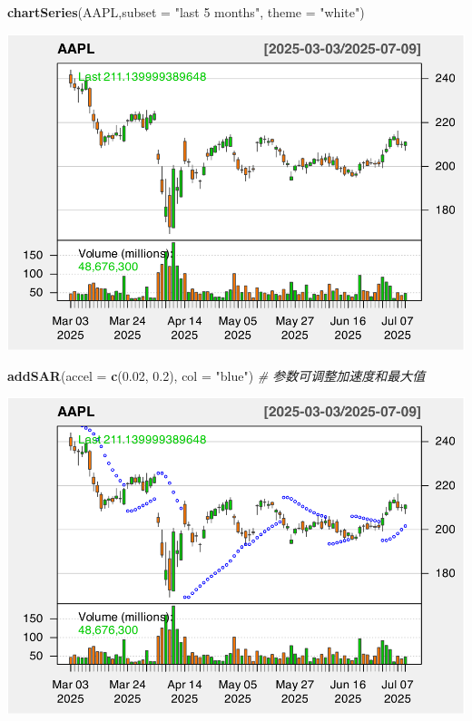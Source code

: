 \documentclass[]{ctexbook}
\newenvironment{Shaded}{\begin{snugshade}}{\end{snugshade}}
\newcommand{\AttributeTok}[1]{\textcolor[rgb]{0.13,0.29,0.53}{#1}}
\newcommand{\CommentTok}[1]{\textcolor[rgb]{0.56,0.35,0.01}{\textit{#1}}}
\newcommand{\FloatTok}[1]{\textcolor[rgb]{0.00,0.00,0.81}{#1}}
\newcommand{\FunctionTok}[1]{\textcolor[rgb]{0.13,0.29,0.53}{\textbf{#1}}}
\newcommand{\NormalTok}[1]{#1}
\newcommand{\StringTok}[1]{\textcolor[rgb]{0.31,0.60,0.02}{#1}}
\begin{document}
\begin{Shaded}
\begin{Highlighting}[]
\FunctionTok{chartSeries}\NormalTok{(AAPL,}\AttributeTok{subset =} \StringTok{"last 5 months"}\NormalTok{, }\AttributeTok{theme =} \StringTok{"white"}\NormalTok{)}
\end{Highlighting}
\end{Shaded}

\includegraphics[width=0.9\linewidth]{quantmod_files/figure-latex/sar-1}

\begin{Shaded}
\begin{Highlighting}[]
\FunctionTok{addSAR}\NormalTok{(}\AttributeTok{accel =} \FunctionTok{c}\NormalTok{(}\FloatTok{0.02}\NormalTok{, }\FloatTok{0.2}\NormalTok{), }\AttributeTok{col =} \StringTok{"blue"}\NormalTok{)  }\CommentTok{\# 参数可调整加速度和最大值}
\end{Highlighting}
\end{Shaded}

\includegraphics[width=0.9\linewidth]{quantmod_files/figure-latex/sar-2}
\end{document}
